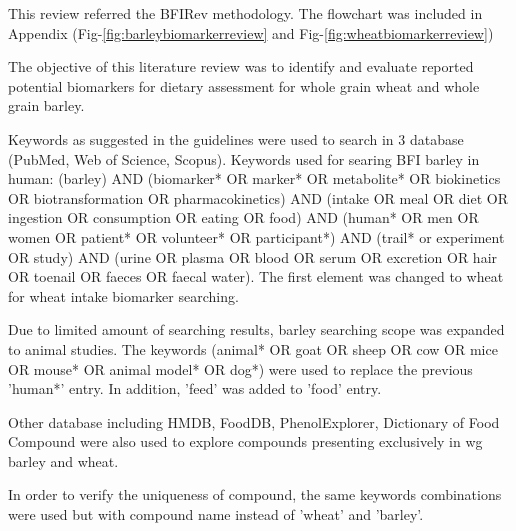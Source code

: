 This review referred the BFIRev methodology\cite{Pratico2018}. The flowchart was included in Appendix (Fig-\ref{fig:barleybiomarkerreview} and Fig-\ref{fig:wheatbiomarkerreview})

The objective of this literature review was to identify and evaluate reported potential biomarkers for dietary assessment for whole grain wheat and whole grain barley.

Keywords as suggested in the guidelines\cite{Pratico2018} were used to search in 3 database (PubMed, Web of Science, Scopus). Keywords used for searing BFI barley in human: 
(barley) AND (biomarker* OR marker* OR metabolite* OR biokinetics OR biotransformation OR pharmacokinetics) AND (intake OR meal OR diet OR ingestion OR consumption OR eating OR food) AND 
(human* OR men OR women OR patient* OR volunteer* OR participant*) AND 
(trail* or experiment OR study) AND (urine OR plasma OR blood OR serum OR excretion OR hair OR toenail OR faeces OR faecal water). The first element was changed to wheat for wheat intake biomarker searching. 

Due to limited amount of searching results, barley searching scope was expanded to animal studies. The keywords (animal* OR goat OR sheep OR cow OR mice OR mouse* OR animal model* OR dog*) were used to replace the previous 'human*' entry. In addition, 'feed' was added to 'food' entry.

Other database including HMDB\cite{hmdb}, FoodDB\cite{foodb}, PhenolExplorer\cite{phenolexplorer}, Dictionary of Food Compound\cite{dictionary} were also used to explore compounds presenting exclusively in \acrshort{wg} barley and wheat. 

In order to verify the uniqueness of compound, the same keywords combinations were used but with compound name instead of 'wheat' and 'barley'.